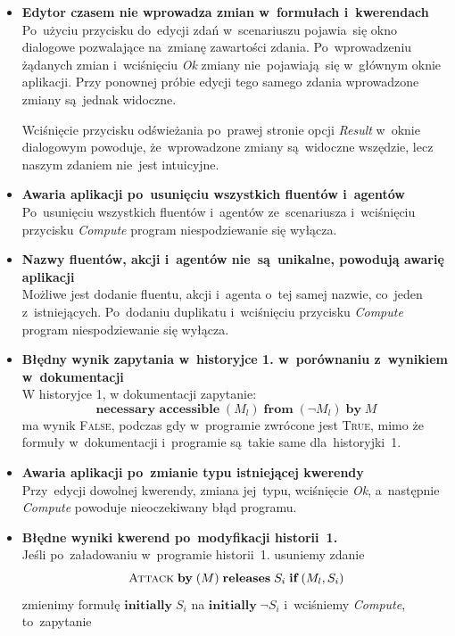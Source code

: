 \documentclass[11pt,a4paper]{article}
\begin{document}
\begin{itemize}
    \item \textbf{Edytor czasem nie wprowadza zmian w~formułach i~kwerendach} \\
    Po~użyciu przycisku do~edycji zdań w~scenariuszu pojawia~się okno dialogowe pozwalające na~zmianę zawartości zdania.
    Po~wprowadzeniu żądanych zmian i~wciśnięciu \emph{Ok} zmiany nie~pojawiają~się w~głównym oknie aplikacji.
    Przy ponownej próbie edycji tego samego zdania wprowadzone zmiany są~jednak widoczne.

    Wciśnięcie przycisku odświeżania po~prawej stronie opcji \emph{Result} w~oknie dialogowym powoduje, że~wprowadzone zmiany są~widoczne wszędzie, lecz naszym zdaniem nie~jest intuicyjne.
    \item \textbf{Awaria aplikacji po~usunięciu wszystkich fluentów i~agentów} \\
    Po~usunięciu wszystkich fluentów i~agentów ze~scenariusza i~wciśnięciu przycisku \emph{Compute} program niespodziewanie się wyłącza.
    \item \textbf{Nazwy fluentów, akcji i~agentów nie~są~unikalne, powodują awarię aplikacji} \\
    Możliwe jest dodanie fluentu, akcji i~agenta o~tej samej nazwie, co~jeden z~istniejących.
    Po~dodaniu duplikatu i~wciśnięciu przycisku \emph{Compute} program niespodziewanie się wyłącza.
    \item \textbf{Błędny wynik zapytania w~historyjce 1. w~porównaniu z~wynikiem w~dokumentacji} \\
    W historyjce 1, w dokumentacji zapytanie: 
    $$\textbf{necessary accessible} \; (M_l) \; \textbf{from} \; (\neg M_l) \; \textbf{by} \; {M}$$
    ma wynik \textsc{False}, podczas gdy w~programie zwrócone jest \textsc{True}, mimo że formuły w~dokumentacji i~programie są~takie same dla~historyjki~1.
    \item \textbf{Awaria aplikacji po~zmianie typu istniejącej kwerendy} \\
    Przy~edycji dowolnej kwerendy, zmiana jej~typu, wciśnięcie \emph{Ok}, a~następnie \emph{Compute} powoduje nieoczekiwany błąd programu.
    \item \textbf{Błędne wyniki kwerend po~modyfikacji historii~1.} \\
    Jeśli po~załadowaniu w~programie historii~1. usuniemy zdanie
    $$\textsc{Attack} \; \textbf{by} \; (M) \; \textbf{releases} \; S_i \; \textbf{if} \; (M_l, S_i) $$
    zmienimy formułę $ \textbf{initially} \; S_i $ na $ \textbf{initially} \; \neg S_i $ i~wciśniemy \emph{Compute}, to~zapytanie

\end{itemize}
\end{document}
